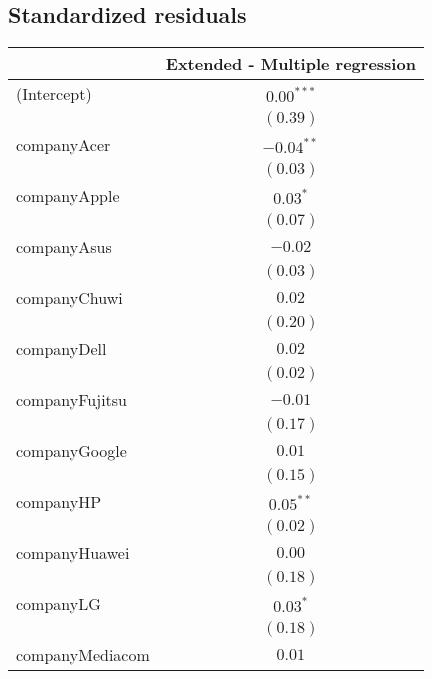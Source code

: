 \documentclass[
]{article}
\begin{document}
\hypertarget{standardized-residuals}{%
\subsection{Standardized residuals}\label{standardized-residuals}}

\begin{table}
\begin{center}
\begin{tabular}{l c}
\hline
 & Extended - Multiple regression \\
\hline
(Intercept)                   & $0.00^{***}$  \\
                              & $(0.39)$      \\
companyAcer                   & $-0.04^{**}$  \\
                              & $(0.03)$      \\
companyApple                  & $0.03^{*}$    \\
                              & $(0.07)$      \\
companyAsus                   & $-0.02$       \\
                              & $(0.03)$      \\
companyChuwi                  & $0.02$        \\
                              & $(0.20)$      \\
companyDell                   & $0.02$        \\
                              & $(0.02)$      \\
companyFujitsu                & $-0.01$       \\
                              & $(0.17)$      \\
companyGoogle                 & $0.01$        \\
                              & $(0.15)$      \\
companyHP                     & $0.05^{**}$   \\
                              & $(0.02)$      \\
companyHuawei                 & $0.00$        \\
                              & $(0.18)$      \\
companyLG                     & $0.03^{*}$    \\
                              & $(0.18)$      \\
companyMediacom               & $0.01$        \\

\end{tabular}
\end{center}
\end{table}
\end{document}
